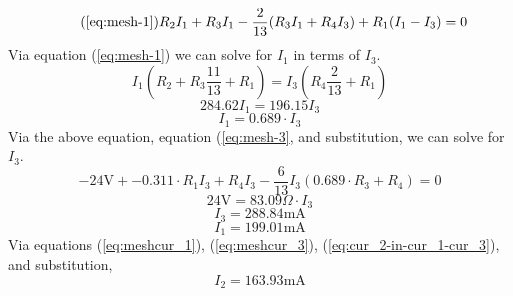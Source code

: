 \documentclass{article}
\begin{document}
	\begin{equation}\tag{\ref{eq:mesh-1}}
		R_2I_1 + R_3I_1-\frac{2}{13}(R_3I_1 + R_4I_3) + R_1(I_1-I_3) = 0
	\end{equation}
	Via equation (\ref{eq:mesh-1}) we can solve for $I_1$ in terms of $I_3$.
	$$ I_1\left(R_2+R_3\frac{11}{13}+R_1 \right)=I_3 \left( R_4 
	\frac{2}{13}+R_1\right)$$
	$$ 284.62I_1 = 196.15I_3$$
	\begin{equation}\label{eq:mesh_1-in-mesh_3}
		I_1 = 0.689 \cdot I_3
	\end{equation}
	Via the above equation, equation (\ref{eq:mesh-3}, and substitution, we can 
	solve for $I_3$.
	$$ -24\text{V} + -0.311\cdot R_1I_3 + R_4I_3 - \frac{6}{13}I_3(0.689\cdot 
	R_3+R_4)=0$$
	$$ 24\text{V} = 83.09 \Omega \cdot I_3$$
	\begin{equation}\label{eq:meshcur_3}
		I_3 = 288.84\text{mA}
	\end{equation}
	\begin{equation}\label{eq:meshcur_1}
		I_1 = 199.01\text{mA}
	\end{equation}
	Via equations (\ref{eq:meshcur_1}), (\ref{eq:meshcur_3}), 
	(\ref{eq:cur_2-in-cur_1-cur_3}), and substitution,
	$$ I_2=163.93\text{mA}$$
\end{document}
